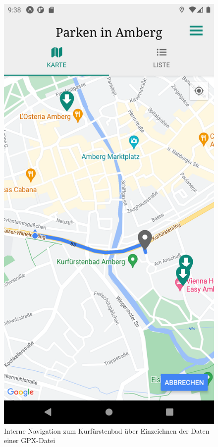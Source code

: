 \begin{figure}
	\vspace{-\baselineskip}
	\centering
	\includegraphics[scale=0.15]{img/navigation}
	\caption{Interne Navigation zum Kurfürstenbad über Einzeichnen der Daten einer GPX-Datei}
	\label{fig:navigation}
\end{figure}
